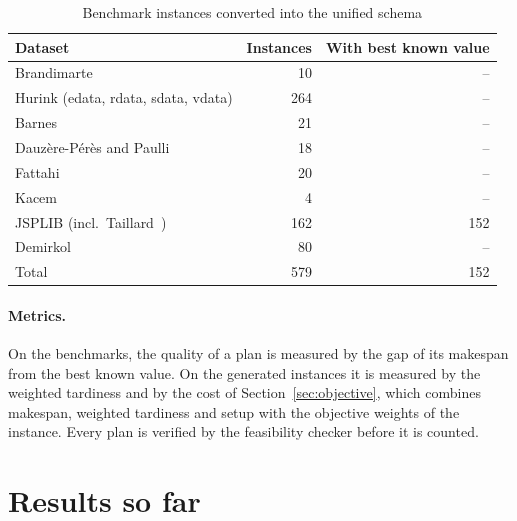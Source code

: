 \begin{table}[htpb]
  \centering
  \small
  \begin{tabular}{@{}lrr@{}}
    \toprule
    \textbf{Dataset} & \textbf{Instances} & \textbf{With best known value} \\
    \midrule
    Brandimarte~\cite{brandimarte1993}          & 10  & -- \\
    Hurink (edata, rdata, sdata, vdata)         & 264 & -- \\
    Barnes                                      & 21  & -- \\
    Dauzère-Pérès and Paulli                    & 18  & -- \\
    Fattahi                                     & 20  & -- \\
    Kacem                                       & 4   & -- \\
    JSPLIB (incl.\ Taillard~\cite{taillard1993}) & 162 & 152 \\
    Demirkol                                    & 80  & -- \\
    \midrule
    Total                                       & 579 & 152 \\
    \bottomrule
  \end{tabular}
  \caption{Benchmark instances converted into the unified schema}
  \label{tab:benchmarks}
\end{table}

\paragraph{Metrics.} On the benchmarks, the quality of a plan is measured by the gap of its
makespan from the best known value. On the generated instances it is measured by the weighted
tardiness and by the cost of Section~\ref{sec:objective}, which combines makespan, weighted
tardiness and setup with the objective weights of the instance. Every plan is verified by the
feasibility checker before it is counted.

\section{Results so far}
\label{sec:results}

